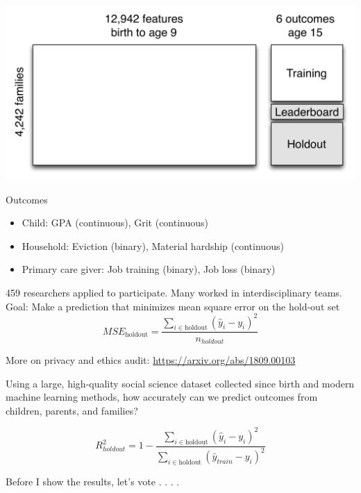 \documentclass{beamer}
\begin{document}
\begin{frame}

\begin{center}
\includegraphics[width=\textwidth]{figures/ffc_design_matrix_ml}
\end{center}

\end{frame}
\begin{frame}

Outcomes
\begin{itemize}
\item Child: GPA (continuous), Grit (continuous)
\item Household:  Eviction (binary), Material hardship (continuous)
\item Primary care giver: Job training (binary), Job loss (binary)
\end{itemize}

\end{frame}
\begin{frame}

459 researchers applied to participate. Many worked in interdisciplinary teams. Goal: Make a prediction that minimizes mean square error on the hold-out set
\begin{equation*}
MSE_{\text{holdout}} = \frac{\sum_{i \in \text{holdout}} (\hat{y}_i - y_i)^2}{n_{holdout}}
\end{equation*}

\vfill
More on privacy and ethics audit: \url{https://arxiv.org/abs/1809.00103}
\end{frame}
\begin{frame}

Using a large, high-quality social science dataset collected since birth and modern machine learning methods, how accurately can we predict outcomes from children, parents, and families?

\begin{equation*}
R^2_{holdout} = 1 - \frac{\sum_{i \in \text{holdout}} (\hat{y}_i - y_i)^2}{\sum_{i \in \text{holdout}} (\bar{y}_{train} - y_i)^2}
\end{equation*}

\pause 
\vfill

Before I show the results, let's vote . . . .

\end{frame}
\end{document}
